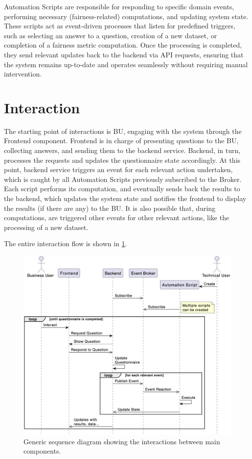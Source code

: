 \documentclass[12pt,a4paper,openright,twoside]{book}
\begin{document}
Automation Scripts are responsible for responding to specific domain events, performing necessary (fairness-related) computations, and updating system state.
%
These scripts act as event-driven processes that listen for predefined triggers, such as selecting an answer to a question, creation of a new dataset, or completion of a fairness metric computation.
%
Once the processing is completed, they send relevant updates back to the backend via \ac{API} requests, ensuring that the system remains up-to-date and operates seamlessly without requiring manual intervention.

\section{Interaction}
The starting point of interactions is \ac{BU}, engaging with the system through the Frontend component.
%
Frontend is in charge of presenting questions to the \ac{BU}, collecting answers, and sending them to the backend service.
%
Backend, in turn, processes the requests and updates the questionnaire state accordingly.
%
At this point, backend service triggers an event for each relevant action undertaken, which is caught by all Automation Scripts previously subscribed to the Broker.
%
Each script performs its computation, and eventually sends back the results to the backend, which updates the system state and notifies the frontend to display the results (if there are any) to the \ac{BU}.
%
It is also possible that, during computations, are triggered other events for other relevant actions, like the processing of a new dataset.

The entire interaction flow is shown in \cref{fig:sequence}.

\begin{figure}
    \centering
    \includegraphics[width=0.70\linewidth]{figures/diagrams/sequence.png}
    \caption{
        Generic sequence diagram showing the interactions between main components.
    }
    \label{fig:sequence}
\end{figure}
\end{document}
